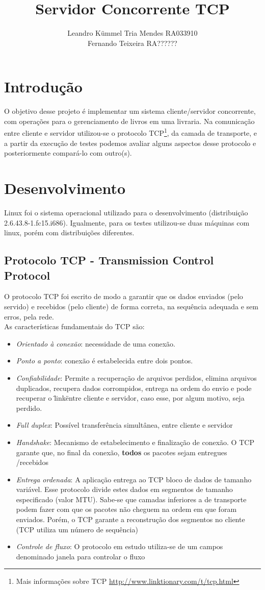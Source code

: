 \documentclass[a4paper,10pt]{article}
\title{Servidor Concorrente TCP}
\author{Leandro Kümmel Tria Mendes RA033910 \\ Fernando Teixeira RA??????}
\begin{document}
\maketitle
\tableofcontents
\listoffigures
\listoftables
\section{Introdução}
O objetivo desse projeto é implementar um sistema cliente/servidor
concorrente, com operações para o gerenciamento de livros em uma livraria.
Na comunicação entre cliente e servidor utilizou-se o protocolo TCP\footnote{
Mais informações sobre TCP \url{http://www.linktionary.com/t/tcp.html} }, da camada de transporte, e a partir da execução de testes podemos avaliar alguns aspectos
desse protocolo e posteriormente compará-lo com outro(s).
\section{Desenvolvimento}
Linux foi o sistema operacional utilizado para o desenvolvimento (distribuição
2.6.43.8-1.fc15.i686). Igualmente, para os testes utilizou-se duas máquinas com linux, porém com distribuições diferentes.
\subsection{Protocolo TCP - Transmission Control Protocol}
O protocolo TCP foi escrito de modo a garantir que os dados enviados (pelo
servido) e recebidos (pelo cliente) de forma correta, na sequência 
adequada e sem erros, pela rede.
\\As características fundamentais do TCP são:
\begin{itemize}
\item \emph{Orientado à conexão}: necessidade de uma conexão.
\item \emph{Ponto a ponto}: conexão é estabelecida entre dois pontos.
\item \emph{Confiabilidade}: Permite a recuperação de arquivos perdidos, elimina 
arquivos duplicados, recupera dados corrompidos, entrega na ordem do envio e 
pode recuperar o \"link\" entre cliente e servidor, caso esse, por algum motivo,
seja perdido.
\item \emph{Full duplex}: Possível transferência simultânea, entre cliente e 
servidor
\item \emph{Handshake}: Mecanismo de estabelecimento e finalização de conexão.
O TCP garante que, no final da conexão, \textbf{todos} os pacotes sejam entregues
/recebidos
\item \emph{Entrega ordenada}: A aplicação entrega ao TCP bloco de dados de 
tamanho variável. Esse protocolo divide estes dados em segmentos de tamanho 
especificado (valor MTU). Sabe-se que camadas inferiores a de transporte podem 
fazer com que os pacotes não cheguem na ordem em que foram enviados. Porém, o TCP
garante a reconstrução dos segmentos no cliente (TCP utiliza um número de 
sequência)
\item \emph{Controle de fluxo}: O protocolo em estudo utiliza-se de um campos 
denominado janela para controlar o fluxo
\end{itemize}
\end{document}

